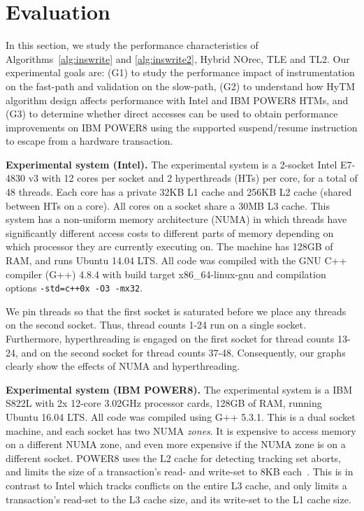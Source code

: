 \section{Evaluation}
\label{sec:eval}
%
In this section, we study the performance characteristics of Algorithms~\ref{alg:inswrite} and \ref{alg:inswrite2}, Hybrid NOrec, TLE and TL2.
Our experimental goals are: (G1) to study the performance impact of instrumentation on the fast-path and validation on the slow-path, 
(G2) to understand how HyTM algorithm design affects performance with Intel and IBM POWER8 HTMs, and 
(G3) to determine whether direct accesses can be used to obtain performance improvements on IBM POWER8 using the supported suspend/resume instruction to escape from a hardware transaction.

\vspace{1mm}\noindent\textbf{Experimental system (Intel).}
The experimental system is a 2-socket Intel E7-4830 v3 with 12 cores per socket and 2 hyperthreads (HTs) per core, for a total of 48 threads.
Each core has a private 32KB L1 cache and 256KB L2 cache (shared between HTs on a core).
All cores on a socket share a 30MB L3 cache.
This system has a non-uniform memory architecture (NUMA) in which threads have significantly different access costs to different parts of memory depending on which processor they are currently executing on.
The machine has 128GB of RAM, and runs Ubuntu 14.04 LTS.
All code was compiled with the GNU C++ compiler (G++) 4.8.4 with build target x86\_64-linux-gnu and compilation options \texttt{-std=c++0x -O3 -mx32}.

We pin threads so that the first socket is saturated before we place any threads on the second socket.
Thus, thread counts 1-24 run on a single socket.
Furthermore, hyperthreading is engaged on the first socket for thread counts 13-24, and on the second socket for thread counts 37-48.
Consequently, our graphs clearly show the effects of NUMA and hyperthreading.

\vspace{1mm}\noindent\textbf{Experimental system (IBM POWER8).}
The experimental system is a IBM S822L with 2x 12-core 3.02GHz processor cards, 128GB of RAM, running Ubuntu 16.04 LTS.
All code was compiled using G++ 5.3.1.
This is a dual socket machine, and each socket has two NUMA \emph{zones}.
It is expensive to access memory on a different NUMA zone, and even more expensive if the NUMA zone is on a different socket.
POWER8 uses the L2 cache for detecting tracking set aborts, and limits the size of a transaction's read- and write-set to 8KB each~\cite{htm-survey}.
This is in contrast to Intel which tracks conflicts on the entire L3 cache, and only limits a transaction's read-set to the L3 cache size, and its write-set to the L1 cache size.

